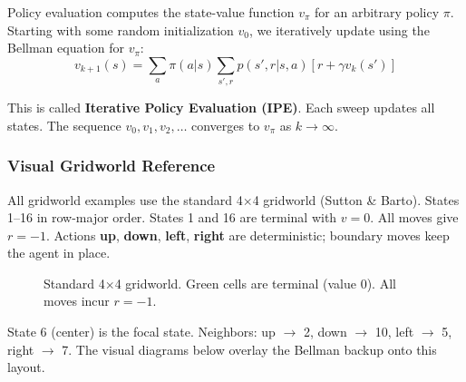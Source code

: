 \documentclass[11pt,a4paper]{article}
\begin{document}
Policy evaluation computes the state-value function $v_\pi$ for an arbitrary policy $\pi$. Starting with some random initialization $v_0$, we iteratively update using the Bellman equation for $v_\pi$:
\[
v_{k+1}(s) = \sum_a \pi(a|s) \sum_{s', r} p(s', r | s, a)[r + \gamma v_k(s')]
\]

This is called \textbf{Iterative Policy Evaluation (IPE)}. Each sweep updates all states. The sequence $v_0, v_1, v_2, \ldots$ converges to $v_\pi$ as $k \to \infty$.

\subsubsection{Visual Gridworld Reference}

All gridworld examples use the standard 4$\times$4 gridworld (Sutton \& Barto). States 1--16 in row-major order. States 1 and 16 are terminal with $v=0$. All moves give $r=-1$. Actions \textbf{up}, \textbf{down}, \textbf{left}, \textbf{right} are deterministic; boundary moves keep the agent in place.

\begin{figure}[H]
\centering
{}
\caption{Standard 4$\times$4 gridworld. Green cells are terminal (value 0). All moves incur $r=-1$.}
\label{fig:gridworld-layout}
\end{figure}

State 6 (center) is the focal state. Neighbors: up $\to$ 2, down $\to$ 10, left $\to$ 5, right $\to$ 7. The visual diagrams below overlay the Bellman backup onto this layout.
\end{document}

